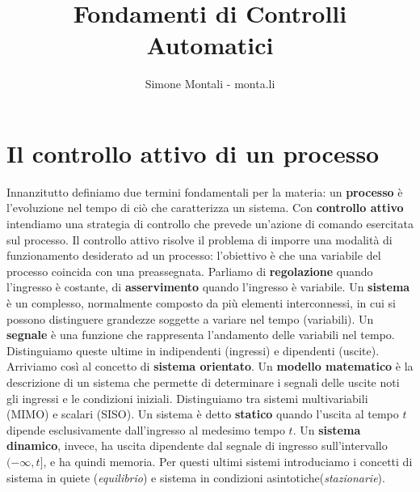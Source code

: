 \documentclass[11pt]{article}
\begin{document}
\author{Simone Montali - monta.li}
\title{Fondamenti di Controlli Automatici}

\maketitle

\medskip
\section{Il controllo attivo di un processo}
Innanzitutto definiamo due termini fondamentali per la materia: un \textbf{processo} è l'evoluzione nel tempo di ciò che caratterizza un sistema. Con \textbf{controllo attivo} intendiamo una strategia di controllo che prevede un'azione di comando esercitata sul processo.
Il controllo attivo risolve il problema di imporre una modalità di funzionamento desiderato ad un processo: l'obiettivo è che una variabile del processo coincida con una preassegnata. Parliamo di \textbf{regolazione} quando l'ingresso è costante, di \textbf{asservimento} quando l'ingresso è variabile.
Un \textbf{sistema} è un complesso, normalmente composto da più elementi interconnessi, in cui si possono distinguere grandezze soggette a variare nel tempo (variabili). Un \textbf{segnale} è una funzione che rappresenta l'andamento delle variabili nel tempo. Distinguiamo queste ultime in indipendenti (ingressi) e dipendenti (uscite). Arriviamo così al concetto di \textbf{sistema orientato}. Un \textbf{modello matematico} è la descrizione di un sistema che permette di determinare i segnali delle uscite noti gli ingressi e le condizioni iniziali. Distinguiamo tra sistemi multivariabili (MIMO) e scalari (SISO). Un sistema è detto \textbf{statico} quando l'uscita al tempo $t$ dipende esclusivamente dall'ingresso al medesimo tempo $t$. Un \textbf{sistema dinamico}, invece, ha uscita dipendente dal segnale di ingresso sull'intervallo $(-\infty , t]$, e ha quindi memoria. Per questi ultimi sistemi introduciamo i concetti di sistema in quiete (\textit{equilibrio}) e sistema in condizioni asintotiche(\textit{stazionarie}).
\end{document}
